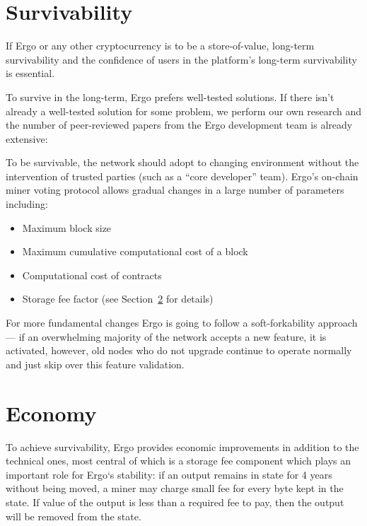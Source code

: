 \documentclass[]{article}
\begin{document}
    \section{Survivability}

    If Ergo or any other cryptocurrency is to be a store-of-value, long-term survivability and the
    confidence of users in the platform’s long-term survivability is essential.

    To survive in the long-term, Ergo prefers well-tested solutions. If there isn't already a well-tested
    solution for some problem, we perform our own research and the number of peer-reviewed
    papers from the Ergo development team is already extensive:~\cite{reyzin2017improving,meshkov2017short,chepurnoy2018systematic,chepurnoy2018self,chepurnoy2018checking,duong2018multi}

    To be survivable, the network should adopt to changing environment without the intervention
    of trusted parties (such as a ``core developer'' team). Ergo's on-chain miner voting protocol
    allows gradual changes in a large number of parameters including:

    \begin{itemize}
        \item Maximum block size
        \item Maximum cumulative computational cost of a block
        \item Computational cost of contracts
        \item Storage fee factor (see Section~\ref{sec:economy} for details)
    \end{itemize}

    For more fundamental changes Ergo is going to follow a soft-forkability
    approach --- if an
    overwhelming majority of the network accepts a new feature, it is activated, however, old nodes
    who do not upgrade continue to operate normally and just skip over this feature validation.

    \section{Economy}
    \label{sec:economy}

    To achieve survivability, Ergo provides economic improvements in addition to the technical
    ones, most central of which is a storage fee component which plays an important role for Ergo`s
    stability: if an output remains in state for 4 years without being moved, a miner may charge
    small fee for every byte kept in the state. If value of the output is less than a required fee to
    pay, then the output will be removed from the state.
\end{document}
